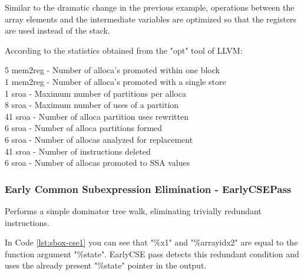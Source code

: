  

 

Similar to the dramatic change in the previous example, operations between the array elements and the intermediate variables are optimized so that the registers are used instead of the stack.

According to the statistics obtained from the "opt" tool of LLVM:

\begin{displayquote}
 5 mem2reg - Number of alloca's promoted within one block \\
 1 mem2reg - Number of alloca's promoted with a single store \\
 1 sroa    - Maximum number of partitions per alloca \\
 8 sroa    - Maximum number of uses of a partition \\
41 sroa    - Number of alloca partition uses rewritten \\
 6 sroa    - Number of alloca partitions formed \\
 6 sroa    - Number of allocas analyzed for replacement \\
41 sroa    - Number of instructions deleted \\
 6 sroa    - Number of allocas promoted to SSA values \\
\end{displayquote}

\subsubsection{Early Common Subexpression Elimination - EarlyCSEPass}\label{sec:earlyCSE1}
Performs a simple dominator tree walk, eliminating trivially redundant instructions.

 
In Code \ref{lst:sbox-cse1} you can see that "\%x1" and "\%arrayidx2" are equal to the function argument "\%state". EarlyCSE pass detects this redundant condition and uses the already present "\%state" pointer in the output.

